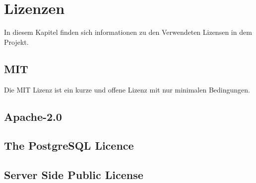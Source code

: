 \chapter{Lizenzen}

In diesem Kapitel finden sich informationen zu den Verwendeten Lizensen in dem Projekt.

\section{MIT}\label{sec:mit}
Die MIT Lizenz ist ein kurze und offene Lizenz mit nur minimalen Bedingungen.


\section{Apache-2.0}\label{sec:apache-2.0}

\section{The PostgreSQL Licence}\label{sec:the-postgresql-licence}


\section{Server Side Public License}\label{sec:server-side-public-license}


